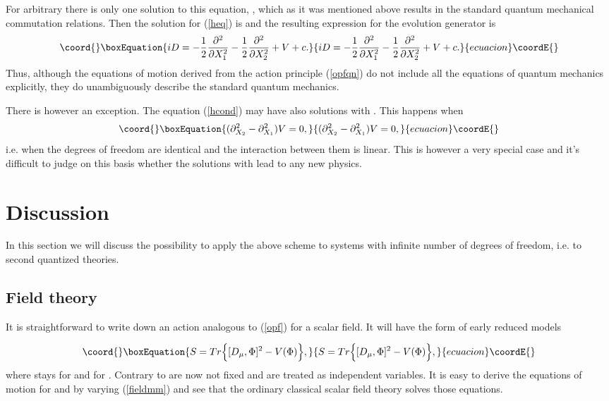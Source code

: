 \documentclass[a4paper,11pt]{article}
\begin{document}
For arbitrary \coordHE{} there is only one solution to this equation,
\coordHE{}, which as it was mentioned above results in the standard
quantum mechanical commutation relations. Then the solution for
(\ref{heq}) is \coordHE{} and the resulting expression for the
evolution generator is
\begin{equation}\coord{}\boxEquation{
iD=-\frac{1}{2}\frac{\partial^2}{\partial X_1^2}-
\frac{1}{2}\frac{\partial^2}{\partial X_2^2}+V+c. \label{sold2f}
}{
iD=-\frac{1}{2}\frac{\partial^2}{\partial X_1^2}-
\frac{1}{2}\frac{\partial^2}{\partial X_2^2}+V+c. }{ecuacion}\coordE{}\end{equation}
Thus, although the equations of motion derived from the action
principle (\ref{opfqn}) do not include all the equations of
quantum mechanics explicitly, they do unambiguously describe the
standard quantum mechanics.

There is however an exception. The equation (\ref{hcond}) may have
also solutions with \coordHE{}. This happens when
\begin{equation}\coord{}\boxEquation{
(\partial^2_{X_2}-\partial^2_{X_1})V=0,
}{
(\partial^2_{X_2}-\partial^2_{X_1})V=0,
}{ecuacion}\coordE{}\end{equation}
i.e. when the degrees of freedom are identical and the interaction
between them is linear. This is however a very special case and
it's difficult to judge on this basis whether the solutions with
\coordHE{} lead to any new physics.



\section{Discussion}
\label{sec6} In this section we will discuss the possibility to
apply the above scheme to systems with infinite number of degrees
of freedom, i.e. to second quantized theories.

\subsection*{Field theory}
It is straightforward to write down an action analogous to
(\ref{opf}) for a scalar field. It will have the form of early
reduced models \cite{eguchikawai}

\begin{equation}\coord{}\boxEquation{
S=Tr \Big\{ [D_\mu,\Phi]^2 - V(\Phi) \Big\}, \label{fieldmm}
}{
S=Tr \Big\{ [D_\mu,\Phi]^2 - V(\Phi) \Big\}, }{ecuacion}\coordE{}\end{equation}
where \coordHE{} stays for \coordHE{} and \coordHE{} for
\coordHE{}. Contrary to \cite{eguchikawai}
\coordHE{} are now not fixed and are treated as independent
variables. It is easy to derive the equations of motion for \myHighlight{$\Phi$}\coordHE{}
and \coordHE{} by varying (\ref{fieldmm}) and see that the ordinary
classical scalar field theory solves those equations.
\end{document}
